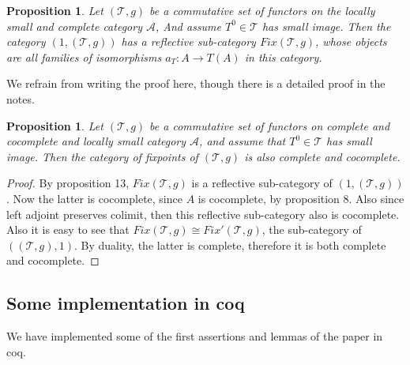 \documentclass[12pt]{article}
\newcounter{the}
\newtheorem{proposition}[the]{Proposition}
\begin{document}
\begin{proposition}
    Let $(\mathscr T, g)$ be a commutative set of functors on the locally small and complete category $\mathscr A$, And assume $T^0 \in \mathscr T$ has small image. Then the category $(1, (\mathscr T, g))$ has a reflective sub-category $Fix (\mathscr T, g)$, whose objects are all families of isomorphisms $a_T: A \to T(A)$ in this category.
\end{proposition}
We refrain from writing the proof here, though there is a detailed proof in the notes. 
\begin{proposition}
    Let $(\mathscr T, g)$ be a commutative set of functors on complete and cocomplete and locally small category $\mathscr A$, and assume that $T^0 \in \mathscr T$ has small image. Then the category of fixpoints of $(\mathscr T, g)$ is also complete and cocomplete.
\end{proposition}
\begin{proof}
    By proposition 13, $Fix (\mathscr T, g)$ is a reflective sub-category of $(1, (\mathscr T, g))$. Now the latter is cocomplete, since $A$ is cocomplete, by proposition 8. Also since left adjoint preserves colimit, then this reflective sub-category also is cocomplete. Also it is easy to see that $Fix (\mathscr T, g) \cong Fix' (\mathscr T, g)$, the sub-category of $((\mathscr T, g), 1)$. By duality, the latter is complete, therefore it is both complete and cocomplete.
\end{proof}

\subsection*{Some implementation in coq}
We have implemented some of the first assertions and lemmas of the paper in coq. 
\end{document}

